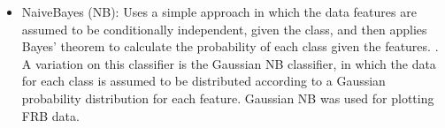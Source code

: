 \documentclass[12pt]{article}
\begin{document}
\begin{itemize}

\item NaiveBayes (NB): Uses a simple approach in which the data features are assumed to be conditionally independent, given the class, and then applies Bayes' theorem to calculate the probability of each class given the features. \cite{john1995estimating}. A variation on this classifier is the Gaussian NB classifier, in which the data for each class is assumed to be distributed according to a Gaussian probability distribution for each feature. Gaussian NB \cite{scikit-learn} was used for plotting FRB data.


\end{itemize}
\end{document}
